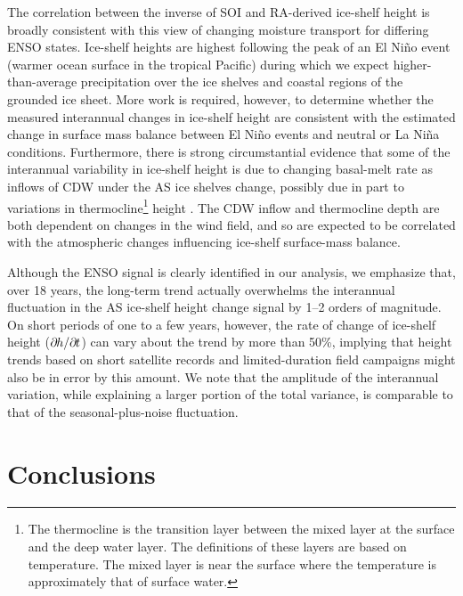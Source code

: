 The correlation between the inverse of SOI and RA-derived ice-shelf height is broadly consistent with this view of changing moisture transport for differing ENSO states. Ice-shelf heights are highest following the peak of an El Ni\~no event (warmer ocean surface in the tropical Pacific) during which we expect higher-than-average precipitation over the ice shelves and coastal regions of the grounded ice sheet. More work is required, however, to determine whether the measured interannual changes in ice-shelf height are consistent with the estimated change in surface mass balance between El Ni\~no events and neutral or La Ni\~na conditions. Furthermore, there is strong circumstantial evidence that some of the interannual variability in ice-shelf height is due to changing basal-melt rate as inflows of CDW under the AS ice shelves change, possibly due in part to variations in thermocline\footnote{The thermocline is the transition layer between the mixed layer at the surface and the deep water layer. The definitions of these layers are based on temperature. The mixed layer is near the surface where the temperature is approximately that of surface water.} height \parencite{Dutrieux2014}. The CDW inflow and thermocline depth are both dependent on changes in the wind field, and so are expected to be correlated with the atmospheric changes influencing ice-shelf surface-mass balance.

Although the ENSO signal is clearly identified in our analysis, we emphasize that, over 18 years, the long-term trend actually overwhelms the interannual fluctuation in the AS ice-shelf height change signal by 1--2 orders of magnitude. On short periods of one to a few years, however, the rate of change of ice-shelf height ($\partial\mkern-1.5mu h/\partial\mkern-1.5mu t$) can vary about the trend by more than 50\%, implying that height trends based on short satellite records and limited-duration field campaigns might also be in error by this amount. We note that the amplitude of the interannual variation, while explaining a larger portion of the total variance, is comparable to that of the seasonal-plus-noise fluctuation. 


\section{Conclusions}

